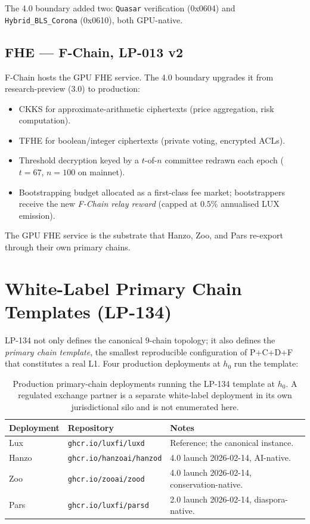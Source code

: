 \documentclass[11pt,a4paper]{article}
\begin{document}
The 4.0 boundary added two: \texttt{Quasar} verification (0x0604) and
\texttt{Hybrid\_BLS\_Corona} (0x0610), both GPU-native.

\subsection{FHE --- F-Chain, LP-013 v2}

F-Chain hosts the GPU FHE service. The 4.0 boundary upgrades it from
research-preview (3.0) to production:

\begin{itemize}[leftmargin=*]
\item CKKS for approximate-arithmetic ciphertexts (price aggregation,
risk computation).
\item TFHE for boolean/integer ciphertexts (private voting, encrypted
ACLs).
\item Threshold decryption keyed by a $t$-of-$n$ committee redrawn
each epoch ($t=67$, $n=100$ on mainnet).
\item Bootstrapping budget allocated as a first-class fee market;
bootstrappers receive the new \emph{F-Chain relay reward} (capped at
$0.5\%$ annualised LUX emission).
\end{itemize}

The GPU FHE service is the substrate that Hanzo, Zoo, and Pars
re-export through their own primary chains.

\section{White-Label Primary Chain Templates (LP-134)}
\label{sec:whitelabel}

LP-134 not only defines the canonical 9-chain topology; it also defines
the \emph{primary chain template}, the smallest reproducible
configuration of P+C+D+F that constitutes a real L1. Four production
deployments at $h_0$ run the template:

\begin{table}[H]
\centering
\small
\begin{tabularx}{\textwidth}{llX}
\toprule
\textbf{Deployment} & \textbf{Repository} & \textbf{Notes} \\
\midrule
Lux & \texttt{ghcr.io/luxfi/luxd} & Reference; the canonical instance. \\
Hanzo & \texttt{ghcr.io/hanzoai/hanzod} & 4.0 launch 2026-02-14, AI-native. \\
Zoo & \texttt{ghcr.io/zooai/zood} & 4.0 launch 2026-02-14, conservation-native. \\
Pars & \texttt{ghcr.io/luxfi/parsd} & 2.0 launch 2026-02-14, diaspora-native. \\
\bottomrule
\end{tabularx}
\caption{Production primary-chain deployments running the LP-134
template at $h_0$. A regulated exchange partner is a separate white-label deployment in
its own jurisdictional silo and is not enumerated here.}
\end{table}
\end{document}
